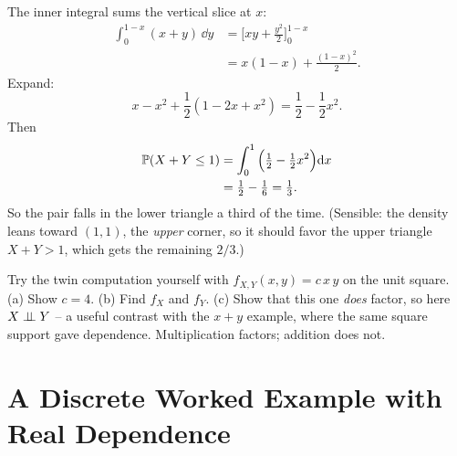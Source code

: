 \begin{example}
The inner integral sums the vertical slice at $x$:
\begin{align*}
  \int_0^{1-x}(x+y)\,\dd y
  &= \Big[xy + \tfrac{y^2}{2}\Big]_0^{1-x} \\
  &= x(1-x) + \tfrac{(1-x)^2}{2}.
\end{align*}
Expand:
\[
  x - x^2 + \frac12(1 - 2x + x^2) = \frac12 - \frac12 x^2.
\]
Then
\begin{align*}
  \operatorname{\mathbb{P}}(X+Y\le1) &= \int_0^1\Big(\tfrac12 - \tfrac12 x^2\Big)\mathrm{d} x \\
  &= \tfrac12 - \tfrac16 = \tfrac13.
\end{align*}
So the pair falls in the lower triangle a third of the time. (Sensible: the
density leans toward $(1,1)$, the \emph{upper} corner, so it should favor the
upper triangle $X+Y>1$, which gets the remaining $2/3$.)
\end{example}

\begin{labbox}
Try the twin computation yourself with $f_{X,Y}(x,y) = c\,x\,y$ on the unit
square. (a) Show $c=4$. (b) Find $f_X$ and $f_Y$. (c) Show that this one
\emph{does} factor, so here $X\perp\!\!\!\perp Y$ -- a useful contrast with the $x+y$
example, where the same square support gave dependence. Multiplication factors;
addition does not.
\end{labbox}

\section{A Discrete Worked Example with Real Dependence}
\label{ch13:worked-discrete}

